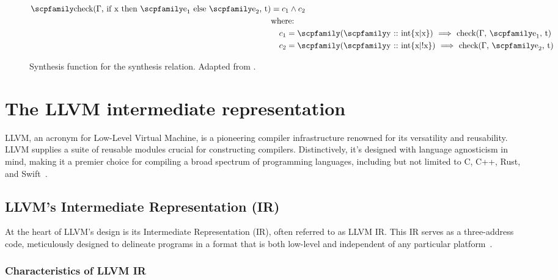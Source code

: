 \documentclass[
  oneside,
  english,
  coorientadorbanca,
  noabntexcite
]{ufsc-thesis-rn46-2019}
\newcommand{\code}[1]{\text{\scpfamily\setlength\spaceskip{0.35em}#1}}
\newcommand{\implcons}[3]{\code{$($\code{#1} $::$ #2$)$ $\implies$ #3}}
\begin{document}
\begin{figure}[ht]
\begin{align*}
    \code{check($\Gamma$, if x then $\code{e}_1$ else $\code{e}_2$, t)}
     & = c_1 \land c_2                                                         \\
     & \textrm{where:}                                                         \\
     & \quad c_1 = \implcons{y}{int\{x|x\}}{check($\Gamma$, $\code{e}_1$, t)}  \\
     & \quad c_2 = \implcons{y}{int\{x|!x\}}{check($\Gamma$, $\code{e}_2$, t)}
  \end{align*}
  \caption{
    Synthesis function for the synthesis relation.
    Adapted from \textcite{jhala2020tutorial}.
  }\label{fig:check_function_impl}
\end{figure}

\chapter{The LLVM intermediate representation}\label{ch:llvm}

LLVM, an acronym for Low-Level Virtual Machine, is a pioneering compiler infrastructure renowned for its versatility and reusability.
LLVM supplies a suite of reusable modules crucial for constructing compilers.
Distinctively, it's designed with language agnosticism in mind, making it a premier choice for compiling a broad spectrum of programming languages, including but not limited to C, C++, Rust, and Swift~\cite{Denisov_2018}.

\section{LLVM's Intermediate Representation (IR)}

At the heart of LLVM's design is its Intermediate Representation (IR), often referred to as LLVM IR\@.
This IR serves as a three-address code, meticulously designed to delineate programs in a format that is both low-level and independent of any particular platform~\cite{10.1145/3276495}.

\subsection{Characteristics of LLVM IR}
\end{document}
